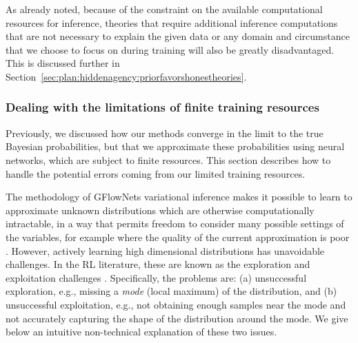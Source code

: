 As already noted, because of the constraint on the available computational resources for inference, theories that require additional inference computations that are not necessary to explain the given data or any domain and circumstance that we choose to focus on during training will also be greatly disadvantaged. This is discussed further in Section~\ref{sec:plan:hiddenagency:priorfavorshonestheories}.

    \subsubsection{Dealing with the limitations of finite training resources}\label{sec:plan:inferencemachine:finitetraining}

Previously, we discussed how our methods converge in the limit to the true Bayesian probabilities, but that we approximate these probabilities using neural networks, which are subject to finite resources. This section describes how to handle the potential errors coming from our limited training resources. 

The methodology of GFlowNets variational inference \cite{openreview.net.forum.id.uKiE0VIluA} makes it possible to learn to approximate unknown distributions which are otherwise computationally intractable, in a way that permits freedom to consider many possible settings of the variables, for example where the quality of the current approximation is poor \cite{openreview.net.forum.id.BdmVgLMvaf}. However, actively learning high dimensional distributions has unavoidable challenges. In the RL literature, these are known as the exploration and exploitation challenges \cite{mitpress.mit.edu.9780262039246.reinforcement.learning}. Specifically, the problems are: (a) unsuccessful exploration, e.g., missing a \emph{mode} (local maximum) of the distribution, and (b) unsuccessful exploitation, e.g., not obtaining enough samples near the mode and not accurately capturing the shape of the distribution around the mode. We give below an intuitive non-technical explanation of these two issues.

